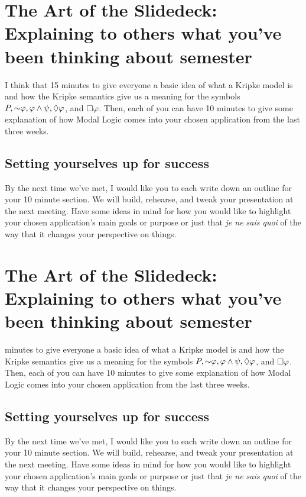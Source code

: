 \chapter[Presentation Preparations]{The Art of the Slidedeck: Explaining to others what you've been thinking about semester}
I think that 15 minutes to give everyone a basic idea of what a Kripke model is and how the Kripke semantics give us a meaning for the symbols
$P, \mathord{\sim} \varphi, \varphi \wedge \psi, \lozenge \varphi$, and $\square \varphi$. Then, each of you can have 10 minutes to 
give some explanation of how Modal Logic comes into your chosen application from the last three weeks.

\setcounter{section}{-1}

\section{Setting yourselves up for success}
By the next time we've met, I would like you to each write down an outline for your 10 minute section. We will build, rehearse,
and tweak your presentation at the next meeting. Have some ideas in mind for how you would like to highlight your chosen
application's main goals or purpose or just that \emph{je ne sais quoi} of the way that it changes your perspective on things.

\chapter[Presentation Preparations]{The Art of the Slidedeck: Explaining to others what you've been thinking about semester}
minutes to give everyone a basic idea of what a Kripke model is and how the Kripke semantics give us a meaning for the symbols
$P, \mathord{\sim} \varphi, \varphi \wedge \psi, \lozenge \varphi$, and $\square \varphi$. Then, each of you can have 10 minutes to 
give some explanation of how Modal Logic comes into your chosen application from the last three weeks.

\setcounter{section}{-1}

\section{Setting yourselves up for success}
By the next time we've met, I would like you to each write down an outline for your 10 minute section. We will build, rehearse,
and tweak your presentation at the next meeting. Have some ideas in mind for how you would like to highlight your chosen
application's main goals or purpose or just that \emph{je ne sais quoi} of the way that it changes your perspective on things.
